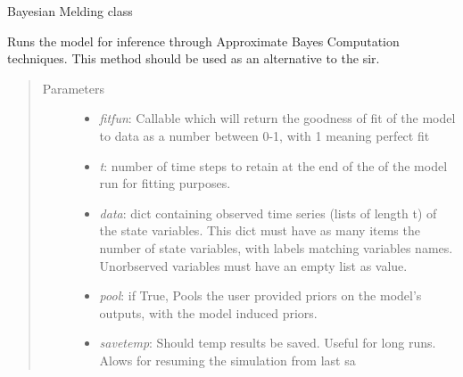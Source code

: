 \documentclass[a4paper,10pt,english]{sphinxmanual}
\begin{document}

\begin{fulllineitems}
\label{BIP.Bayes:BIP.Bayes.Melding.Meld}
Bayesian Melding class

\begin{fulllineitems}
\label{BIP.Bayes:BIP.Bayes.Melding.Meld.abcRun}
Runs the model for inference through Approximate Bayes Computation
techniques. This method should be used as an alternative to the sir.
\begin{quote}\begin{description}
\item[{Parameters}] \leavevmode\begin{itemize}
\item {} 
\emph{fitfun}: Callable which will return the goodness of fit of the model to data as a number between 0-1, with 1 meaning perfect fit

\item {} 
\emph{t}: number of time steps to retain at the end of the of the model run for fitting purposes.

\item {} 
\emph{data}: dict containing observed time series (lists of length t) of the state variables. This dict must have as many items the number of state variables, with labels matching variables names. Unorbserved variables must have an empty list as value.

\item {} 
\emph{pool}: if True, Pools the user provided priors on the model's outputs, with the model induced priors.

\item {} 
\emph{savetemp}: Should temp results be saved. Useful for long runs. Alows for resuming the simulation from last sa

\end{itemize}

\end{description}\end{quote}

\end{fulllineitems}


\end{fulllineitems}
\end{document}
